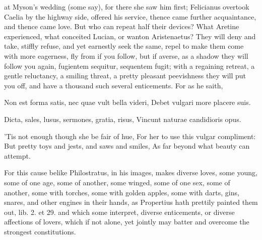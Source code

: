 at Myson's wedding (some say), for there she saw him first; Felicianus
overtook Caelia by the highway side, offered his service, thence came
further acquaintance, and thence came love. But who can repeat half
their devices? What Aretine experienced, what conceited Lucian, or
wanton Aristenaetus? They will deny and take, stiffly refuse, and yet
earnestly seek the same, repel to make them come with more eagerness,
fly from if you follow, but if averse, as a shadow they will follow you
again, fugientem sequitur, sequentem fugit; with a regaining retreat, a
gentle reluctancy, a smiling threat, a pretty pleasant peevishness they
will put you off, and have a thousand such several enticements. For as
he saith,

Non est forma satis, nec quae vult bella videri,
Debet vulgari more placere suis.

Dicta, sales, lusus, sermones, gratia, risus,
Vincunt naturae candidioris opus.


'Tis not enough though she be fair of hue,
For her to use this vulgar compliment:
But pretty toys and jests, and saws and smiles,
As far beyond what beauty can attempt.

For this cause belike Philostratus, in his images, makes diverse
loves, some young, some of one age, some of another, some winged, some
of one sex, some of another, some with torches, some with golden
apples, some with darts, gins, snares, and other engines in their
hands, as Propertius hath prettily painted them out, lib. 2. et 29. and
which some interpret, diverse enticements, or diverse affections of
lovers, which if not alone, yet jointly may batter and overcome the
strongest constitutions.

